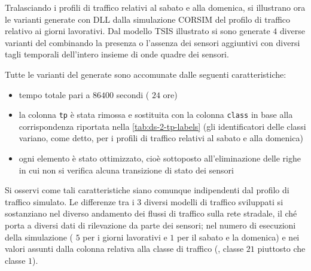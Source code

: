 Tralasciando i profili di traffico relativi al sabato e alla domenica, si illustrano ora le varianti generate con  \acs{DLL} dalla simulazione \acs{CORSIM} del profilo di traffico relativo ai giorni lavorativi. Dal modello \acs{TSIS} illustrato si sono generate $4$ diverse varianti del  combinando la presenza o l'assenza dei sensori aggiuntivi con diversi tagli temporali dell'intero insieme di onde quadre dei sensori.

Tutte le varianti del  generate sono accomunate dalle seguenti caratteristiche:
\begin{itemize}
	\item tempo totale pari a $86400$ secondi (\ie{} $24$ ore)
	\item la colonna \lstinline[]|tp| è stata rimossa e sostituita con la colonna \lstinline[]|class| in base alla corrispondenza riportata nella \vref{tab:ds-2-tp-labels} (gli identificatori delle classi variano, come detto, per i profili di traffico relativi al sabato e alla domenica)
	\item ogni elemento è stato ottimizzato, cioè sottoposto all'eliminazione delle righe in cui non si verifica alcuna transizione di stato dei sensori
\end{itemize}
Si osservi come tali caratteristiche siano comunque indipendenti dal profilo di traffico simulato. Le differenze tra i $3$ diversi modelli di traffico sviluppati si sostanziano nel diverso andamento dei flussi di traffico sulla rete stradale, il ché porta a diversi dati di rilevazione da parte dei sensori; nel numero di esecuzioni della simulazione (\ie{} $5$ per i giorni lavorativi e $1$ per il sabato e la domenica) e nei valori assunti dalla colonna relativa alla classe di traffico (\eg{}, classe $21$ piuttosto che classe $1$).

